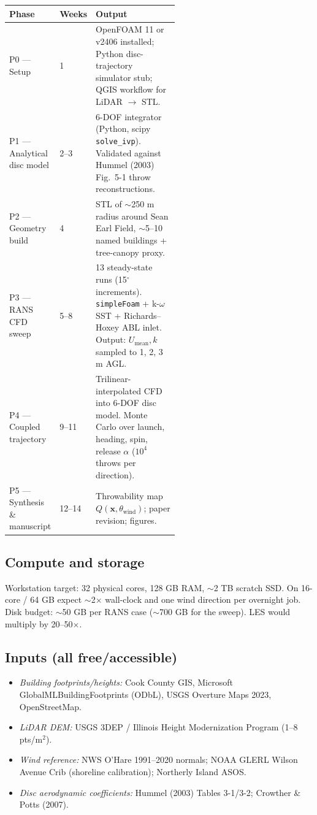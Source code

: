 \begin{center}
\footnotesize
\begin{tabular}{@{}llp{0.55\linewidth}@{}}
\toprule
\textbf{Phase} & \textbf{Weeks} & \textbf{Output} \\
\midrule
P0 --- Setup & 1 & OpenFOAM 11 or v2406 installed; Python disc-trajectory simulator stub; QGIS workflow for LiDAR $\to$ STL. \\
P1 --- Analytical disc model & 2--3 & 6-DOF integrator (Python, scipy \texttt{solve\_ivp}). Validated against Hummel (2003) Fig.\ 5-1 throw reconstructions. \\
P2 --- Geometry build & 4 & STL of $\sim$250 m radius around Sean Earl Field, $\sim$5--10 named buildings + tree-canopy proxy. \\
P3 --- RANS CFD sweep & 5--8 & 13 steady-state runs (15$^\circ$ increments). \texttt{simpleFoam} + k-$\omega$ SST + Richards--Hoxey ABL inlet. Output: $U_{\text{mean}}, k$ sampled to 1, 2, 3 m AGL. \\
P4 --- Coupled trajectory & 9--11 & Trilinear-interpolated CFD into 6-DOF disc model. Monte Carlo over launch, heading, spin, release $\alpha$ ($10^4$ throws per direction). \\
P5 --- Synthesis \& manuscript & 12--14 & Throwability map $Q(\mathbf{x}, \theta_{\text{wind}})$; paper revision; figures. \\
\bottomrule
\end{tabular}
\end{center}

\subsection{Compute and storage}

Workstation target: 32 physical cores, 128 GB RAM, $\sim$2 TB scratch SSD. On 16-core / 64 GB expect $\sim$2$\times$ wall-clock and one wind direction per overnight job. Disk budget: $\sim$50 GB per RANS case ($\sim$700 GB for the sweep). LES would multiply by 20--50$\times$.

\subsection{Inputs (all free/accessible)}

\begin{itemize}[leftmargin=*,itemsep=2pt]
  \item \emph{Building footprints/heights:} Cook County GIS, Microsoft GlobalMLBuildingFootprints (ODbL), USGS Overture Maps 2023, OpenStreetMap.
  \item \emph{LiDAR DEM:} USGS 3DEP / Illinois Height Modernization Program (1--8 pts/m$^2$).
  \item \emph{Wind reference:} NWS O'Hare 1991--2020 normals; NOAA GLERL Wilson Avenue Crib (shoreline calibration); Northerly Island ASOS.
  \item \emph{Disc aerodynamic coefficients:} Hummel (2003) Tables 3-1/3-2; Crowther \& Potts (2007).
\end{itemize}

